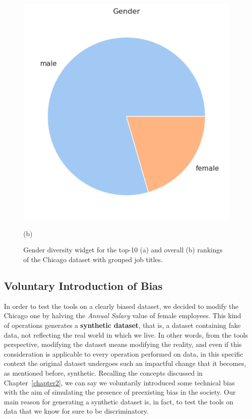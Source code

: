 \begin{itemize}
\begin{itemize}
\begin{figure}[t!]
\begin{minipage}{0.45\textwidth}
\includegraphics[width=\textwidth]{figures/chicago_grouped_rankingfacts1b.png}
\caption*{(b)}
\end{minipage}
\caption{\textrm{Gender} diversity widget for the top-10 (a) and overall (b) rankings of the Chicago dataset with grouped job titles.}
\label{fig:chicago_grouped_rankingfacts}
\end{figure}

\end{itemize}
\end{itemize}


\subsection{Voluntary Introduction of Bias}
In order to test the tools on a clearly biased dataset, we decided to modify the Chicago one by halving the \textit{Annual Salary} value of female employees. This kind of operations generates a \textbf{synthetic dataset}, that is, a dataset containing fake data, not reflecting the real world in which we live. In other words, from the tools perspective, modifying the dataset means modifying the reality, and even if this consideration is applicable to every operation performed on data, in this specific context the original dataset undergoes such an impactful change that it becomes, as mentioned before, synthetic. Recalling the concepts discussed in Chapter~\ref{chapter2}, we can say we voluntarily introduced some technical bias with the aim of simulating the presence of preexisting bias in the society. Our main reason for generating a synthetic dataset is, in fact, to test the tools on data that we know for sure to be discriminatory.


